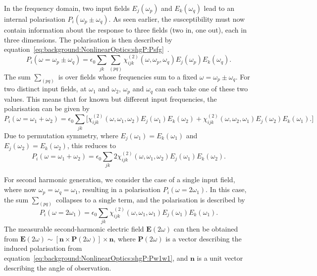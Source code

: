 In the frequency domain, two input fields $E_{j}(\omega_{p} )$ and $E_{k}(\omega_{q} )$ lead to an internal polarisation $P_{i}(\omega_{p}\pm\omega_{q} )$. As seen earlier, the susceptibility must now contain information about the response to three fields (two in, one out), each in three dimensions. The polarisation is then described by equation~\ref{eq:background:NonlinearOptics:shgP:Psfg}~\cite[\S 1.3]{Boyd2008a}.
\begin{equation}\label{eq:background:NonlinearOptics:shgP:Psfg}
	P_{i}(\omega=\omega_{p}\pm\omega_{q} ) =  \epsilon_{0} \sum_{jk} \sum_{(pq)}
				\chi^{(2)}_{ijk}(\omega, \omega_{p},\omega_{q} ) 
				E_{j}(\omega_{p} ) E_{k}(\omega_{q} ).
\end{equation}
The sum $\sum_{(pq)}$ is over fields whose frequencies sum to a fixed $\omega=\omega_{p}\pm\omega_{q}$. For two distinct input fields, at $\omega_{1}$ and $\omega_{2}$, $\omega_{p}$ and $\omega_{q}$ can each take one of these two values. This means that for known but different input frequencies, the polarisation can be given by 
\begin{equation}\label{eq:background:NonlinearOptics:shgP:Pw1w2}
	P_{i}(\omega=\omega_{1}+\omega_{2} ) =  \epsilon_{0} \sum_{jk} \big[
				\chi^{(2)}_{ijk}(\omega, \omega_{1},\omega_{2} ) 
				E_{j}(\omega_{1} ) E_{k}(\omega_{2} ) +
				\chi^{(2)}_{ijk}(\omega, \omega_{2},\omega_{1} ) 
				E_{j}(\omega_{2} ) E_{k}(\omega_{1} ).
				\big]
\end{equation}
Due to permutation symmetry, where $E_{j}(\omega_{1} )=E_{k}(\omega_{1} )$ and $E_{j}(\omega_{2} )=E_{k}(\omega_{2} )$, this reduces to~\cite[eq. 1.3.15]{Boyd2008a}
\begin{equation}\label{eq:background:NonlinearOptics:shgP:Pw1w2b}
	P_{i}(\omega=\omega_{1}+\omega_{2} ) =  \epsilon_{0} \sum_{jk}
				2 \chi^{(2)}_{ijk}(\omega, \omega_{1},\omega_{2} ) 
				E_{j}(\omega_{1} ) E_{k}(\omega_{2} ).
\end{equation}

For second harmonic generation, we consider the case of a single input field, where now $\omega_{p}=\omega_{q}=\omega_{1}$, resulting in a polarisation $P_{i}(\omega=2\omega_{1} )$. In this case, the sum $\sum_{(pq)}$ collapses to a single term, and the polarisation is described by
\begin{equation}\label{eq:background:NonlinearOptics:shgP:Pw1w1}
	P_{i}(\omega=2\omega_{1} ) =  \epsilon_{0} \sum_{jk}
				\chi^{(2)}_{ijk}(\omega, \omega_{1},\omega_{1} ) 
				E_{j}(\omega_{1} ) E_{k}(\omega_{1} ).
\end{equation}
The measurable second-harmonic electric field $\mathbf{E}(2\omega)$ can then be obtained from $\mathbf{E}(2\omega)\sim[\mathbf{n}\times\mathbf{P}(2\omega)]\times\mathbf{n}$, where $\mathbf{P}(2\omega)$ is a vector describing the induced polarisation from equation~\ref{eq:background:NonlinearOptics:shgP:Pw1w1}, and $\mathbf{n}$ is a unit vector describing the angle of observation. 


